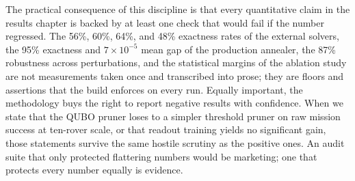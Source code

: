 The practical consequence of this discipline is that every quantitative
claim in the results chapter is backed by at least one check that would
fail if the number regressed. The 56\%, 60\%, 64\%, and 48\% exactness
rates of the external solvers, the 95\% exactness and $7\times10^{-5}$
mean gap of the production annealer, the 87\% robustness across
perturbations, and the statistical margins of the ablation study are not
measurements taken once and transcribed into prose; they are floors and
assertions that the build enforces on every run. Equally important, the
methodology buys the right to report negative results with confidence. When
we state that the QUBO pruner loses to a simpler threshold pruner on raw
mission success at ten-rover scale, or that readout training yields no
significant gain, those statements survive the same hostile scrutiny as the
positive ones. An audit suite that only protected flattering numbers would
be marketing; one that protects every number equally is evidence.
